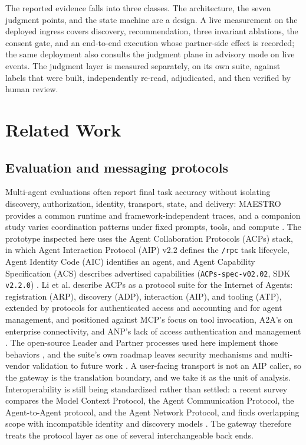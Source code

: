 \documentclass[runningheads,a4paper]{llncs}
\begin{document}
The reported evidence falls into three classes. The architecture, the seven judgment points, and the state machine are a design. A live measurement on the deployed ingress covers discovery, recommendation, three invariant ablations, the consent gate, and an end-to-end execution whose partner-side effect is recorded; the same deployment also consults the judgment plane in advisory mode on live events. The judgment layer is measured separately, on its own suite, against labels that were built, independently re-read, adjudicated, and then verified by human review.

\section{Related Work}

\subsection{Evaluation and messaging protocols}

Multi-agent evaluations often report final task accuracy without isolating discovery, authorization, identity, transport, state, and delivery: MAESTRO \cite{maestro2026} provides a common runtime and framework-independent traces, and a companion study varies coordination patterns under fixed prompts, tools, and compute \cite{kim2026scaling}. The prototype inspected here uses the Agent Collaboration Protocols (ACPs) stack, in which Agent Interaction Protocol (AIP) v2.2 defines the \texttt{/\allowbreak{}rpc} task lifecycle, Agent Identity Code (AIC) identifies an agent, and Agent Capability Specification (ACS) describes advertised capabilities (\texttt{ACPs-spe\allowbreak{}c-v02.02}, SDK \texttt{v2.2.0}) \cite{acps2026repo}. Li et al. describe ACPs as a protocol suite for the Internet of Agents: registration (ARP), discovery (ADP), interaction (AIP), and tooling (ATP), extended by protocols for authenticated access and accounting and for agent management, and positioned against MCP's focus on tool invocation, A2A's on enterprise connectivity, and ANP's lack of access authentication and management \cite{li2025acps,liu2025acps}. The open-source Leader and Partner processes used here implement those behaviors \cite{acps2026repo}, and the suite's own roadmap leaves security mechanisms and multi-vendor validation to future work \cite{liu2025acps}. A user-facing transport is not an AIP caller, so the gateway is the translation boundary, and we take it as the unit of analysis. Interoperability is still being standardized rather than settled: a recent survey compares the Model Context Protocol, the Agent Communication Protocol, the Agent-to-Agent protocol, and the Agent Network Protocol, and finds overlapping scope with incompatible identity and discovery models \cite{interop2025}. The gateway therefore treats the protocol layer as one of several interchangeable back ends.
\end{document}
